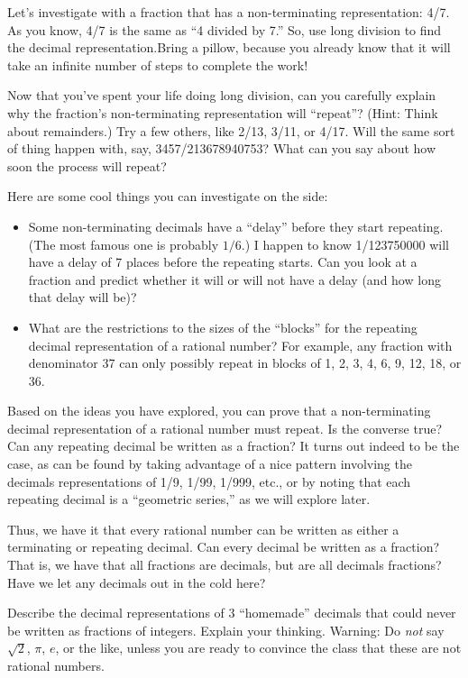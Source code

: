 Let's investigate with a fraction that has a non-terminating representation:  4/7.  As you know, 4/7 is the same as ``4 divided by 7.''  So, use long division to find the decimal representation.Bring a pillow, because you already know that it will take an infinite number of steps to complete the work!

Now that you've spent your life doing long division, can you carefully explain why the fraction's non-terminating representation will ``repeat''?  (Hint:  Think about remainders.)  Try a few others, like 2/13, 3/11, or 4/17.  Will the same sort of thing happen with, say, 3457/213678940753?  What can you say about how soon the process will repeat?  

Here are some cool things you can investigate on the side:
\begin{itemize}
\item Some non-terminating decimals have a ``delay'' before they start repeating.  (The most famous one is probably $1/6$.)  I happen to know 1/123750000 will have a delay of 7 places before the repeating starts.  Can you look at a fraction and predict whether it will or will not have a delay (and how long that delay will be)?   
\item What are the restrictions to the sizes of the ``blocks'' for the repeating decimal representation of a rational number?  For example, any fraction with denominator 37 can only possibly repeat in blocks of 1, 2, 3, 4, 6, 9, 12, 18, or 36.
\end{itemize}

Based on the ideas you have explored, you can prove that a non-terminating decimal representation of a rational number must repeat.  Is the converse true?  Can any repeating decimal be written as a fraction?  It turns out indeed to be the case, as can be found by taking advantage of a nice pattern involving the decimals representations of 1/9, 1/99, 1/999, etc., or by noting that each repeating decimal is a ``geometric series,'' as we will explore later.  

Thus, we have it that every rational number can be written as either a terminating or repeating decimal.  Can every decimal be written as a fraction?  That is, we have that all fractions are decimals, but are all decimals fractions?  Have we let any decimals out in the cold here?

\begin{question} Describe the decimal representations of 3 ``homemade'' decimals that could never be written as fractions of integers.  Explain your thinking.  Warning:  Do \emph{not} say  $\sqrt{2}$, $\pi$, $e$, or the like, unless you are ready to convince the class that these are not rational numbers.
\end{question}
\QM

